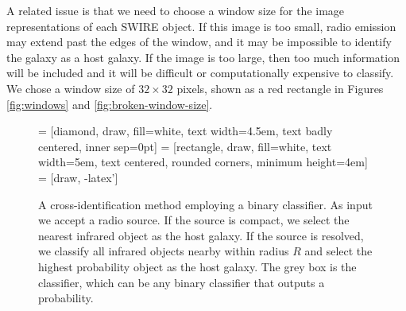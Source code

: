 \documentclass[fleqn,usenatbib,usedcolumn]{mnras}
\begin{document}
    A related issue is that we need to choose a window size for the image
    representations of each SWIRE object. If this image is too small, radio
    emission may extend past the edges of the window, and it may be impossible
    to identify the galaxy as a host galaxy. If the image is too large, then
    too much information will be included and it will be difficult or
    computationally expensive to classify. We chose a window size of $32
    \times 32$ pixels, shown as a red rectangle in Figures
    \ref{fig:windows} and \ref{fig:broken-window-size}.

    \begin{figure}
      \centering
       = [diamond, draw, fill=white,
          text width=4.5em, text badly centered, inner sep=0pt]
       = [rectangle, draw, fill=white,
          text width=5em, text centered, rounded corners, minimum height=4em]
       = [draw, -latex']
      \caption{A cross-identification method employing a binary classifier. As
        input we accept a radio source. If the source is compact, we select
        the nearest infrared object as the host galaxy. If the source is
        resolved, we classify all infrared objects nearby within radius $R$
        and select the highest probability object as the host galaxy. The grey
        box is the classifier, which can be any binary classifier that outputs
        a probability.}
      \label{fig:flowchart}
    \end{figure}
\end{document}

